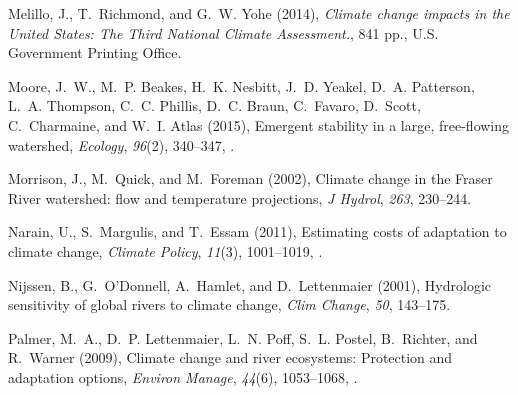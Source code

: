 \documentclass{AGUJournal}
\begin{document}
\begin{thebibliography}{38}
Melillo, J., T.~Richmond, and G.~W. Yohe (2014), \textit{Climate change impacts
  in the {U}nited {S}tates: The Third National Climate Assessment.}, 841 pp.,
  {U.S.} Government Printing Office.

Moore, J.~W., M.~P. Beakes, H.~K. Nesbitt, J.~D. Yeakel, D.~A. Patterson, L.~A.
  Thompson, C.~C. Phillis, D.~C. Braun, C.~Favaro, D.~Scott, C.~Charmaine, and
  W.~I. Atlas (2015), Emergent stability in a large, free{-}flowing watershed,
  \textit{Ecology}, \textit{96}(2), 340--347,
  .

Morrison, J., M.~Quick, and M.~Foreman (2002), Climate change in the {Fraser
  River} watershed: flow and temperature projections, \textit{J Hydrol},
  \textit{263}, 230--244.

Narain, U., S.~Margulis, and T.~Essam (2011), Estimating costs of adaptation to
  climate change, \textit{Climate Policy}, \textit{11}(3), 1001--1019,
  .

Nijssen, B., G.~{O'Donnell}, A.~Hamlet, and D.~Lettenmaier (2001), Hydrologic
  sensitivity of global rivers to climate change, \textit{Clim Change},
  \textit{50}, 143--175.

Palmer, M.~A., D.~P. Lettenmaier, L.~N. Poff, S.~L. Postel, B.~Richter, and
  R.~Warner (2009), Climate change and river ecosystems: Protection and
  adaptation options, \textit{Environ Manage}, \textit{44}(6), 1053--1068,
  .


\end{thebibliography}
\end{document}
